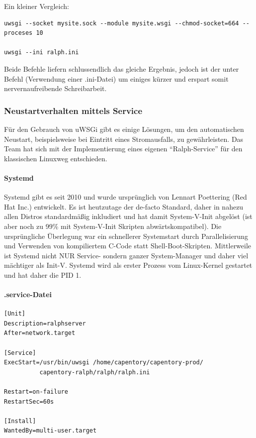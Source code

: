 \documentclass[
]{article}
\begin{document}
Ein kleiner Vergleich:

\begin{verbatim}
uwsgi --socket mysite.sock --module mysite.wsgi --chmod-socket=664 --proceses 10

uwsgi --ini ralph.ini
\end{verbatim}

Beide Befehle liefern schlussendlich das gleiche Ergebnis, jedoch ist
der unter Befehl (Verwendung einer .ini-Datei) um einiges kürzer und
erspart somit nervernaufreibende Schreibarbeit.

\hypertarget{neustartverhalten-mittels-service}{%
\subsubsection{Neustartverhalten mittels
Service}\label{neustartverhalten-mittels-service}}

Für den Gebrauch von uWSGi gibt es einige Lösungen, um den automatischen
Neustart, beispielsweise bei Eintritt eines Stromausfalls, zu
gewährleisten. Das Team hat sich mit der Implementierung eines eigenen
``Ralph-Service'' für den klassischen Linuxweg entschieden.

\hypertarget{systemd}{%
\paragraph{Systemd}\label{systemd}}

Systemd gibt es seit 2010 und wurde ursprünglich von Lennart Poettering
(Red Hat Inc.) entwickelt. Es ist heutzutage der de-facto Standard,
daher in nahezu allen Distros standardmäßig inkludiert und hat damit
System-V-Init abgelöst (ist aber noch zu 99\% mit System-V-Init Skripten
abwärtskompatibel). Die ursprüngliche Überlegung war ein schnellerer
Systemstart durch Parallelisierung und Verwenden von kompiliertem C-Code
statt Shell-Boot-Skripten. Mittlerweile ist Systemd nicht NUR Service-
sondern ganzer System-Manager und daher viel mächtiger als Init-V.
Systemd wird als erster Prozess vom Linux-Kernel gestartet und hat daher
die PID 1.

\hypertarget{service-datei}{%
\paragraph{.service-Datei}\label{service-datei}}

\begin{verbatim}
[Unit]
Description=ralphserver
After=network.target

[Service]
ExecStart=/usr/bin/uwsgi /home/capentory/capentory-prod/
          capentory-ralph/ralph/ralph.ini

Restart=on-failure
RestartSec=60s

[Install]
WantedBy=multi-user.target
\end{verbatim}
\end{document}

